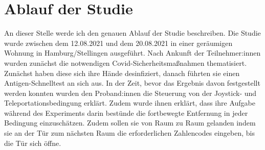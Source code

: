     \section{Ablauf der Studie}
        An dieser Stelle werde ich den genauen Ablauf der Studie beschreiben.
        Die Studie wurde zwischen dem 12.08.2021 und dem 20.08.2021 in einer geräumigen Wohnung in Hamburg/Stellingen ausgeführt. Nach Ankunft der Teilnehmer:innen wurden zunächst die notwendigen Covid-Sicherheitsmaßnahmen thematisiert.
        Zunächst haben diese sich ihre Hände desinfiziert, danach führten sie einen Antigen-Schnelltest an sich aus. In der Zeit, bevor das Ergebnis davon festgestellt werden konnten wurden den Proband:innen die Steuerung von der Joystick- und Teleportationsbedingung erklärt.
        Zudem wurde ihnen erklärt, dass ihre Aufgabe während des Experiments darin bestünde die fortbewegte Entfernung in jeder Bedingung einzuschätzen. Zudem sollen sie von Raum zu Raum gelanden indem sie an der Tür zum nächsten Raum die erforderlichen Zahlencodes eingeben, bis die Tür sich öffne. %

